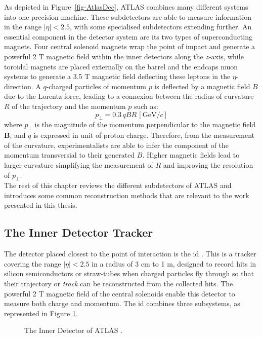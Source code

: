 As depicted in Figure~\ref{fig-AtlasDec}, ATLAS combines many different systems into one precision machine. These subdetectors are able to measure information in the range $|\eta|<  2.5$, with some specialised subdetectors extending further. An essential component in the detector system are its two types of superconducting magnets. Four central solenoid magnets wrap the point of impact and generate a powerful 2 T magnetic field within the inner detectors along the $z$-axis, while toroidal magnets are placed externally on the barrel and the endcaps muon systems to generate a 3.5 T magnetic field deflecting these leptons in the $\eta$-direction. A $q$-charged particles of momentum $p$ is deflected by a magnetic field $B$ due to the Lorentz force, leading to a connexion between the radius of curvature $R$ of the trajectory and the momentum $p$ such as: 
\begin{equation}
  p_{\perp} = 0.3 \, qBR \, [\text{GeV}/c]
\end{equation}
where $p_{\perp}$ is the magnitude of the momentum perpendicular to the magnetic field $\boldsymbol{B}$, and $q$ is expressed in unit of proton charge. Therefore, from the measurement of the curvature, experimentalists are able to infer the component of the momentum transversial to their generated $B$. Higher magnetic fields lead to larger curvature simplifying the measurement of $R$ and improving the resolution of $p_{\perp}$. \\ 

The rest of this chapter reviews the different subdetectors of ATLAS and introduces some common reconstruction methods that are relevant to the work presented in this thesis. 

\subsection{The Inner Detector Tracker}
The detector placed closest to the point of interaction is the \gls{id} \cite{CERN-LHCC-97-016}. This is a tracker covering the range $|\eta| < 2.5$ in a radius of 3 cm to 1 m, designed to record hits in silicon semiconductors or straw-tubes when charged particles fly through so that their trajectory or \textit{track} can be reconstructed from the collected hits. The powerful 2 T magnetic field of the central solenoids enable this detector to measure both charge and momentum. The \gls{id} combines three subsystems, as represented in Figure \ref{fig-AtlasDecID}. 

\begin{figure}[!h]
  \centering
  \hspace{-1.25cm}
  \caption{The Inner Detector of ATLAS \cite{ATLASschematics}.}
  \label{fig-AtlasDecID}
\end{figure}

